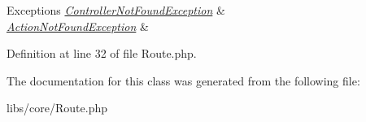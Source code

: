 \begin{DoxyExceptions}{\-Exceptions}
{\em \hyperlink{class_controller_not_found_exception}{\-Controller\-Not\-Found\-Exception}} & \\
\hline
{\em \hyperlink{class_action_not_found_exception}{\-Action\-Not\-Found\-Exception}} & \\
\hline
\end{DoxyExceptions}


\-Definition at line 32 of file \-Route.\-php.



\-The documentation for this class was generated from the following file\-:\begin{DoxyCompactItemize}
\item 
libs/core/\-Route.\-php\end{DoxyCompactItemize}
